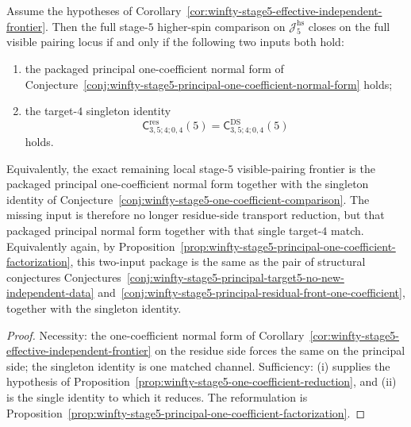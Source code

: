\begin{corollary}
\label{cor:winfty-stage5-exact-remaining-input}
Assume the hypotheses of
Corollary~\ref{cor:winfty-stage5-effective-independent-frontier}.  Then
the full stage-$5$ higher-spin comparison on \(\mathcal{J}_5^{\mathrm{hs}}\)
closes on the full visible pairing locus if and only if the following
two inputs both hold:
\begin{enumerate}[label=\textup{(\roman*)}]
\item the packaged principal one-coefficient normal form of
  Conjecture~\ref{conj:winfty-stage5-principal-one-coefficient-normal-form}
  holds;
\item the target-$4$ singleton identity
  \[
  \mathsf{C}^{\mathrm{res}}_{3,5;4;0,4}(5)
  =
  \mathsf{C}^{\mathrm{DS}}_{3,5;4;0,4}(5)
  \]
  holds.
\end{enumerate}
Equivalently, the exact remaining local stage-$5$ visible-pairing
frontier is the packaged principal one-coefficient normal form together
with the singleton identity of
Conjecture~\ref{conj:winfty-stage5-one-coefficient-comparison}.  The
missing input is therefore no longer residue-side transport reduction,
but that packaged principal normal form together with that single
target-$4$ match.  Equivalently again, by
Proposition~\ref{prop:winfty-stage5-principal-one-coefficient-factorization},
this two-input package is the same as the pair of structural
conjectures
Conjectures~\ref{conj:winfty-stage5-principal-target5-no-new-independent-data}
and~\ref{conj:winfty-stage5-principal-residual-front-one-coefficient},
together with the singleton identity.
\end{corollary}

\begin{proof}
Necessity: the one-coefficient normal form of Corollary~\ref{cor:winfty-stage5-effective-independent-frontier} on the residue side forces the same on the principal side; the singleton identity is one matched channel.  Sufficiency: \textup{(i)} supplies the hypothesis of Proposition~\ref{prop:winfty-stage5-one-coefficient-reduction}, and \textup{(ii)} is the single identity to which it reduces.  The reformulation is Proposition~\ref{prop:winfty-stage5-principal-one-coefficient-factorization}.
\end{proof}

